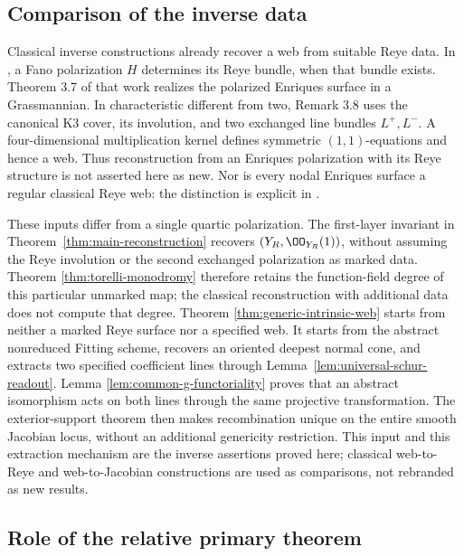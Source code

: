 \subsection{Comparison of the inverse data}
\label{sec:inverse-data-comparison}

Classical inverse constructions already recover a web from suitable
Reye data.  In \cite[Proposition 3.6]{MMV}, a Fano polarization
\(H\) determines its Reye bundle, when that bundle exists.
Theorem 3.7 of that work realizes the polarized Enriques surface in
a Grassmannian.  In characteristic different from two, Remark 3.8
uses the canonical K3 cover, its involution, and two exchanged line
bundles \(L^+,L^-\).  A four-dimensional multiplication kernel
defines symmetric \((1,1)\)-equations and hence a web.  Thus
reconstruction from an Enriques polarization with its Reye structure
is not asserted here as new.  Nor is every nodal Enriques surface a
regular classical Reye web: the distinction is explicit in
\cite[Remark 1.2 and Section 6]{MMV}.

These inputs differ from a single quartic polarization.  The first-layer
invariant in Theorem~\ref{thm:main-reconstruction} recovers
\((Y_R,\OO_{Y_R}(1))\), without assuming the Reye involution or
the second exchanged polarization as marked data.  Theorem
\ref{thm:torelli-monodromy} therefore retains the function-field
degree of this particular unmarked map; the classical reconstruction
with additional data does not compute that degree.  Theorem
\ref{thm:generic-intrinsic-web} starts from neither a marked Reye
surface nor a specified web.  It starts from the abstract nonreduced
Fitting scheme, recovers an oriented deepest normal cone, and extracts
two specified coefficient lines through
Lemma~\ref{lem:universal-schur-readout}.  Lemma
\ref{lem:common-g-functoriality} proves that an abstract isomorphism
acts on both lines through the same projective transformation.
The exterior-support theorem then makes recombination unique on the
entire smooth Jacobian locus, without an additional genericity
restriction.  This input and this extraction mechanism are the inverse
assertions proved here; classical web-to-Reye and web-to-Jacobian
constructions are used as comparisons, not rebranded as new results.

\subsection{Role of the relative primary theorem}
\label{sec:relative-tool-positioning}

